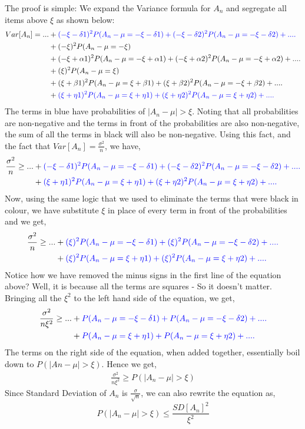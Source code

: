 The proof is simple: We expand the Variance formula for $A_n$ and segregate all items above $\xi$ as shown below:
	\begin{align*}
		Var[A_n] =  ...&+ \textcolor{blue}{(-\xi-\delta1)^2P(A_n-\mu = -\xi-\delta1) + (-\xi-\delta2)^2P(A_n-\mu = -\xi-\delta2) + ....}\\
				     &+ (-\xi)^2P(A_n-\mu = -\xi) \\
				     &+ (-\xi+\alpha1)^2P(A_n-\mu = -\xi+\alpha1) +  (-\xi+\alpha2)^2P(A_n-\mu = -\xi+\alpha2) + ....\\ 	
				     &+ (\xi)^2P(A_n-\mu = \xi) \\
				     &+ (\xi+\beta1)^2P(A_n-\mu = \xi+\beta1) +  (\xi+\beta2)^2P(A_n-\mu = -\xi+\beta2) + ....\\
				     &+\textcolor{blue}{(\xi+\eta1)^2P(A_n-\mu =\xi+\eta1) + (\xi+\eta2)^2P(A_n-\mu = \xi+\eta2) + ....}	
	\end{align*}
The terms in blue have probabilities of $|A_n-\mu| > \xi$. Noting that all probabilities are non-negative and the terms in front of the probabilities are also non-negative, the sum of all the terms in black will also be non-negative. Using this fact, and the fact that $Var[A_n] = \frac{\sigma^2}{n}$, we have,
	\begin{align*}
		 \frac{\sigma^2}{n} \geq  ...&+ \textcolor{blue}{(-\xi-\delta1)^2P(A_n-\mu = -\xi-\delta1) + (-\xi-\delta2)^2P(A_n-\mu = -\xi-\delta2) + ....}\\
				     			 &+\textcolor{blue}{(\xi+\eta1)^2P(A_n-\mu =\xi+\eta1) + (\xi+\eta2)^2P(A_n-\mu = \xi+\eta2) + ....}	
	\end{align*}
Now, using the same logic that we used to eliminate the terms that were black in colour, we have substitute $\xi$ in place of every term in front of the probabilities and we get, 
	\begin{align*}
		 \frac{\sigma^2}{n} \geq  ...&+ \textcolor{blue}{(\xi)^2P(A_n-\mu = -\xi-\delta1) + (\xi)^2P(A_n-\mu = -\xi-\delta2) + ....}\\
				     			 &+\textcolor{blue}{(\xi)^2P(A_n-\mu =\xi+\eta1) + (\xi)^2P(A_n-\mu = \xi+\eta2) + ....}	
	\end{align*}
Notice how we have removed the minus signs in the first line of the equation above? Well, it is because all the terms are squares - So it doesn't matter. Bringing all the $\xi^2$ to the left hand side of the equation, we get,
	\begin{align*}
		 \frac{\sigma^2}{n\xi^2} \geq  ...&+ \textcolor{blue}{P(A_n-\mu = -\xi-\delta1) + P(A_n-\mu = -\xi-\delta2) + ....}\\
				     			 &+\textcolor{blue}{P(A_n-\mu =\xi+\eta1) +P(A_n-\mu = \xi+\eta2) + ....}	
	\end{align*}	
The terms on the right side of the equation, when added together, essentially boil down to $P(|An-\mu| > \xi)$. Hence we get,
	\begin{align*}
		 \frac{\sigma^2}{n\xi^2} \geq  P(|A_n-\mu| > \xi)	
	\end{align*}
Since Standard Deviation of $A_n$ is  $\frac{\sigma}{\sqrt{n}}$, we can also rewrite the equation as,
	\[ P(|A_n-\mu| > \xi) \leq \frac{SD[A_n]^2}{\xi^2} \]
	
